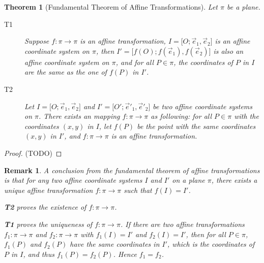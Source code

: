 \documentclass[onecolumn]{ctexart}
\newtheorem{theorem}{Theorem}
\newtheorem{remark}{Remark}
\begin{document}
\begin{theorem}[Fundamental Theorem of Affine Transformations]
  Let $\pi$ be a plane.
  \begin{description}
    \item[T1] Suppose $f: \pi \to \pi$ is an affine transformation, $I = \lbrack 
    O; \vec{e}_1, \vec{e}_2 \rbrack$ is an affine coordinate system on $\pi$, 
    then $I' = \lbrack f(O); f(\vec{e}_1), f(\vec{e}_2) \rbrack$ is also an 
    affine coordinate system on $\pi$, and for all $P \in \pi$, the coordinates 
    of $P$ in $I$ are the same as the one of $f(P)$ in $I'$.
    \item[T2] Let $I = \lbrack O; \vec{e}_1, \vec{e}_2 \rbrack$ and $I' = \lbrack 
    O'; \vec{e}'_1, \vec{e}'_2 \rbrack$ be two affine coordinate systems on $\pi$. 
    There exists an mapping $f: \pi \to \pi$ as following: for all $P \in \pi$ 
    with the coordinates $(x, y)$ in $I$, let $f(P)$ be the point with the same 
    coordinates $(x, y)$ in $I'$, and $f: \pi \to \pi$ is an affine 
    transformation.
  \end{description}
\end{theorem}
\begin{proof}
  (TODO)
\end{proof}

\begin{remark}
  A conclusion from the fundamental theorem of affine transformations is that 
  for any two affine coordinate systems $I$ and $I'$ on a plane $\pi$, there 
  exists a unique affine transformation $f: \pi \to \pi$ such that $f(I) = I'$.

  \textbf{T2} proves the existence of $f: \pi \to \pi$.

  \textbf{T1} proves the uniqueness of $f: \pi \to \pi$. If there are two affine 
  transformations $f_1: \pi \to \pi$ and $f_2: \pi \to \pi$ with $f_1(I) = I'$ 
  and $f_2(I) = I'$, then for all $P \in \pi$, $f_1(P)$ and $f_2(P)$ have the 
  same coordinates in $I'$, which is the coordinates of $P$ in $I$, and thus 
  $f_1(P) = f_2(P)$. Hence $f_1 = f_2$.
\end{remark}
\end{document}
